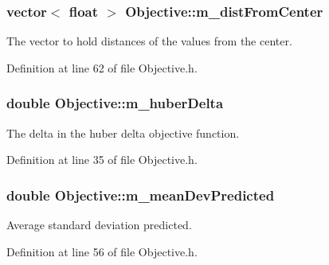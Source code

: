 \subsubsection[{\texorpdfstring{m\+\_\+dist\+From\+Center}{m_distFromCenter}}]{\setlength{\rightskip}{0pt plus 5cm}vector$<$ float $>$ Objective\+::m\+\_\+dist\+From\+Center\hspace{0.3cm}{\ttfamily [private]}}\hypertarget{classObjective_a762220972dd5dcf5c6051b39ba417682}{}\label{classObjective_a762220972dd5dcf5c6051b39ba417682}


The vector to hold distances of the values from the center. 



Definition at line 62 of file Objective.\+h.

\subsubsection[{\texorpdfstring{m\+\_\+huber\+Delta}{m_huberDelta}}]{\setlength{\rightskip}{0pt plus 5cm}double Objective\+::m\+\_\+huber\+Delta\hspace{0.3cm}{\ttfamily [private]}}\hypertarget{classObjective_a324b9129dd2d2c4bdc868587883e35b9}{}\label{classObjective_a324b9129dd2d2c4bdc868587883e35b9}


The delta in the huber delta objective function. 



Definition at line 35 of file Objective.\+h.

\subsubsection[{\texorpdfstring{m\+\_\+mean\+Dev\+Predicted}{m_meanDevPredicted}}]{\setlength{\rightskip}{0pt plus 5cm}double Objective\+::m\+\_\+mean\+Dev\+Predicted\hspace{0.3cm}{\ttfamily [private]}}\hypertarget{classObjective_adaebe7ea3f61983ad40915331c665097}{}\label{classObjective_adaebe7ea3f61983ad40915331c665097}


Average standard deviation predicted. 



Definition at line 56 of file Objective.\+h.

